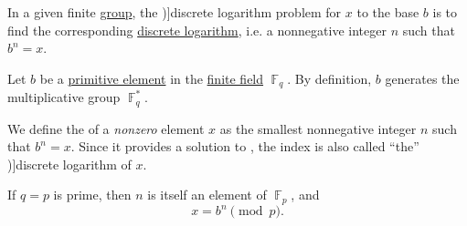 \begin{problem}\label{prob:discrete_logarithm}
  In a given finite \hyperref[def:group]{group}, the \term[ru=задача дискретного логарифморования (в конечном поле) (\cite[52]{АлферовИПр2002ОсновыКриптографии})]{discrete logarithm problem} for \( x \) to the base \( b \) is to find the corresponding \hyperref[def:discrete_logarithm]{discrete logarithm}, i.e. a nonnegative integer \( n \) such that \( b^n = x \).
\end{problem}

\begin{definition}\label{def:finite_field_index}
  Let \( b \) be a \hyperref[def:finite_field_primitive_element]{primitive element} in the \hyperref[def:finite_field]{finite field} \( \BbbF_q \). By definition, \( b \) generates the multiplicative group \( \BbbF_q^* \).

  We define the  of a \emph{nonzero} element \( x \) as the smallest nonnegative integer \( n \) such that \( b^n = x \). Since it provides a solution to , the index is also called \enquote{the} \term[en=discrete logarithm (\cite[def. 4.4.4]{Rosen2019DiscreteMathematics})]{discrete logarithm} of \( x \).

  If \( q = p \) is prime, then \( n \) is itself an element of \( \BbbF_p \), and
  \begin{equation}\label{eq:def:finite_field_index}
    x = b^n \pmod p.
  \end{equation}
\end{definition}

